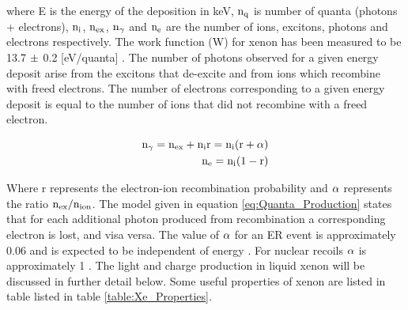 \noindent where E is the energy of the deposition in keV, $\rm n_q$ is number of quanta (photons + electrons), $\rm n_i$, $\rm n_{ex}$, $\rm n_\gamma$ and $\rm n_e$ are the number of ions, excitons, photons and electrons respectively. The work function (W) for xenon has been measured to be 13.7 $\rm \pm$ 0.2  [eV/quanta]  \cite{Dahl_Thesis}. The number of photons observed for a given energy deposit arise from the excitons that de-excite and from ions which recombine with freed electrons. The number of electrons corresponding to a given energy deposit is equal to the number of ions that did not recombine with a freed electron. 

\begin{equation}
\begin{split}
\rm  n_\gamma = n_{ex} + n_i r = n_i (r+\alpha) \\
\rm  n_e = n_i (1-r)\\
\label{eq:Quanta_Production}
\end{split}
\end{equation}

\noindent Where r represents the electron-ion recombination probability and $\rm \alpha$ represents the ratio $\rm n_{ex}/n_{ion}$. The model given in equation \ref{eq:Quanta_Production} states that for each additional photon produced from recombination a corresponding electron is lost, and visa versa. The value of $\rm \alpha$ for an ER event is approximately 0.06 and is expected to be independent of energy \cite{alpha_argon} \cite{alpha_xenon} \cite{Dahl_Thesis}. For nuclear recoils $\rm \alpha$ is approximately 1 \cite{Dahl_Thesis}.  The light and charge production in liquid xenon will be discussed in further detail below. Some useful properties of xenon are listed in table listed in table \ref{table:Xe_Properties}. 

